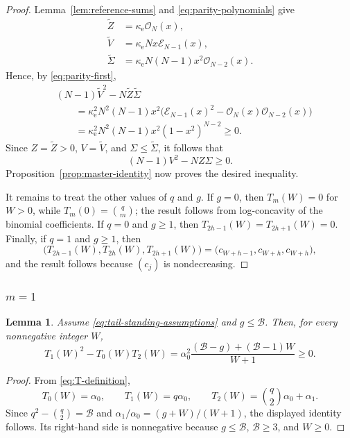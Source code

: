\documentclass[12pt]{amsart}
\newcommand{\Bc}{\mathcal{B}}
\theoremstyle{plain}
\newtheorem{lemma}[theorem]{Lemma}
\theoremstyle{definition}
\theoremstyle{remark}
\begin{document}
\begin{proof}
Lemma~\ref{lem:reference-sums} and
\eqref{eq:parity-polynomials} give
\[
\begin{aligned}
 \widetilde Z
 &=\kappa_{\mathrm e}\mathcal O_N(x),\\
 \widetilde V
 &=\kappa_{\mathrm e}Nx\mathcal E_{N-1}(x),\\
 \widetilde\Sigma
 &=\kappa_{\mathrm e}N(N-1)x^2\mathcal O_{N-2}(x).
\end{aligned}
\]
Hence, by \eqref{eq:parity-first},
\[
\begin{aligned}
 &(N-1)\widetilde V^2
 -N\widetilde Z\widetilde\Sigma\\
 &\qquad=
 \kappa_{\mathrm e}^2N^2(N-1)x^2
 \bigl(
 \mathcal E_{N-1}(x)^2
 -\mathcal O_N(x)\mathcal O_{N-2}(x)
 \bigr)\\
 &\qquad=
 \kappa_{\mathrm e}^2N^2(N-1)x^2(1-x^2)^{N-2}
 \ge0.
\end{aligned}
\]
Since \(Z=\widetilde Z>0\), \(V=\widetilde V\), and
\(\Sigma\le\widetilde\Sigma\), it follows that
\[
 (N-1)V^2-NZ\Sigma\ge0.
\]
Proposition~\ref{prop:master-identity} now proves the desired inequality.

It remains to treat the other values of \(q\) and \(g\).  If \(g=0\),
then \(T_m(W)=0\) for \(W>0\), while
\(T_m(0)=\binom qm\); the result follows from log-concavity of the
binomial coefficients.  If \(q=0\) and \(g\ge1\), then
\(T_{2h-1}(W)=T_{2h+1}(W)=0\).  Finally, if \(q=1\) and \(g\ge1\), then
\[
 \bigl(T_{2h-1}(W),T_{2h}(W),T_{2h+1}(W)\bigr)
 =
 \bigl(c_{W+h-1},c_{W+h},c_{W+h}\bigr),
\]
and the result follows because \((c_j)\) is nondecreasing.
\end{proof}

\subsubsection{\(m=1\)}

\begin{lemma}\label{lem:m-one}
Assume \eqref{eq:tail-standing-assumptions} and \(g\le\Bc\).  Then, for
every nonnegative integer \(W\),
\[
 T_1(W)^2-T_0(W)T_2(W)
 =
 \alpha_0^2
 \frac{(\Bc-g)+(\Bc-1)W}{W+1}
 \ge0.
\]
\end{lemma}

\begin{proof}
From \eqref{eq:T-definition},
\[
 T_0(W)=\alpha_0,\qquad
 T_1(W)=q\alpha_0,\qquad
 T_2(W)=\binom q2\alpha_0+\alpha_1.
\]
Since \(q^2-\binom q2=\Bc\) and
\(\alpha_1/\alpha_0=(g+W)/(W+1)\), the displayed identity follows.
Its right-hand side is nonnegative because \(g\le\Bc\),
\(\Bc\ge3\), and \(W\ge0\).
\end{proof}
\end{document}
